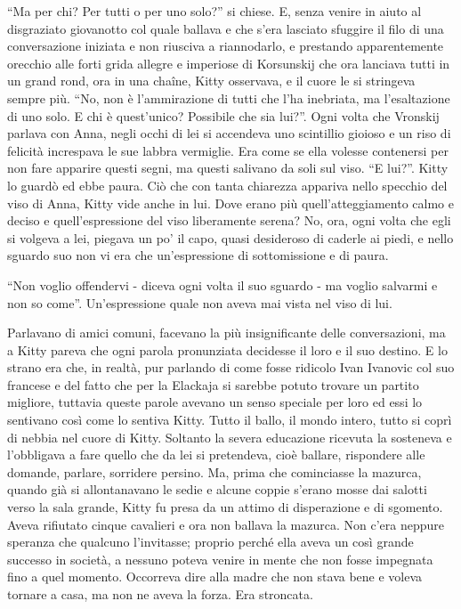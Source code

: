``Ma per chi? Per tutti o per uno solo?'' si chiese. E, senza venire in aiuto al disgraziato giovanotto col quale ballava e che s'era lasciato sfuggire il filo di una conversazione iniziata e non riusciva a riannodarlo, e prestando apparentemente orecchio alle forti grida allegre e imperiose di Korsunskij che ora lanciava tutti in un grand rond, ora in una chaîne, Kitty osservava, e il cuore le si stringeva sempre più. ``No, non è l'ammirazione di tutti che l'ha inebriata, ma l'esaltazione di uno solo. E chi è quest'unico? Possibile che sia lui?''. Ogni volta che Vronskij parlava con Anna, negli occhi di lei si accendeva uno scintillio gioioso e un riso di felicità increspava le sue labbra vermiglie. Era come se ella volesse contenersi per non fare apparire questi segni, ma questi salivano da soli sul viso. ``E lui?''. Kitty lo guardò ed ebbe paura. Ciò che con tanta chiarezza appariva nello specchio del viso di Anna, Kitty vide anche in lui. Dove erano più quell'atteggiamento calmo e deciso e quell'espressione del viso liberamente serena? No, ora, ogni volta che egli si volgeva a lei, piegava un po' il capo, quasi desideroso di caderle ai piedi, e nello sguardo suo non vi era che un'espressione di sottomissione e di paura. 

``Non voglio offendervi - diceva ogni volta il suo sguardo - ma voglio salvarmi e non so come''. Un'espressione quale non aveva mai vista nel viso di lui. 

Parlavano di amici comuni, facevano la più insignificante delle conversazioni, ma a Kitty pareva che ogni parola pronunziata decidesse il loro e il suo destino. E lo strano era che, in realtà, pur parlando di come fosse ridicolo Ivan Ivanovic col suo francese e del fatto che per la Elackaja si sarebbe potuto trovare un partito migliore, tuttavia queste parole avevano un senso speciale per loro ed essi lo sentivano così come lo sentiva Kitty. Tutto il ballo, il mondo intero, tutto si coprì di nebbia nel cuore di Kitty. Soltanto la severa educazione ricevuta la sosteneva e l'obbligava a fare quello che da lei si pretendeva, cioè ballare, rispondere alle domande, parlare, sorridere persino. Ma, prima che cominciasse la mazurca, quando già si allontanavano le sedie e alcune coppie s'erano mosse dai salotti verso la sala grande, Kitty fu presa da un attimo di disperazione e di sgomento. Aveva rifiutato cinque cavalieri e ora non ballava la mazurca. Non c'era neppure speranza che qualcuno l'invitasse; proprio perché ella aveva un così grande successo in società, a nessuno poteva venire in mente che non fosse impegnata fino a quel momento. Occorreva dire alla madre che non stava bene e voleva tornare a casa, ma non ne aveva la forza. Era stroncata. 


